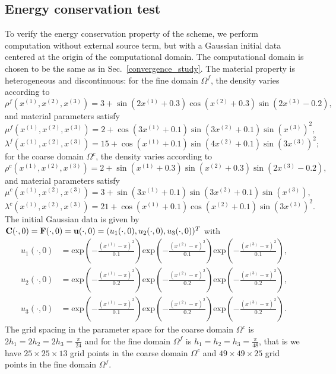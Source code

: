\subsection{Energy conservation test}\label{conserved_energy}
To verify the energy conservation property of the scheme, we perform computation without external source term, but with a Gaussian initial data centered at the origin of the computational domain. The computational domain is chosen to be the same as in Sec.~\ref{convergence_study}. The material property is heterogeneous and discontinuous: for the fine domain $\Omega^f$, the density varies according to
\[\rho^f(x^{(1)},x^{(2)},x^{(3)}) = 3 + \sin(2x^{(1)}+0.3)\cos(x^{(2)}+0.3)\sin(2x^{(3)}-0.2),\] 
and material parameters satisfy
\[\mu^f(x^{(1)},x^{(2)},x^{(3)}) = 2 + \cos(3x^{(1)}+0.1)\sin(3x^{(2)}+0.1)\sin(x^{(3)})^2,\]
\[\lambda^f(x^{(1)},x^{(2)},x^{(3)}) = 15 + \cos(x^{(1)}+0.1)\sin(4x^{(2)}+0.1)\sin(3x^{(3)})^2;\]
for the coarse domain $\Omega^c$, the density varies according to
\[\rho^c(x^{(1)},x^{(2)},x^{(3)}) = 2 + \sin(x^{(1)}+0.3)\sin(x^{(2)}+0.3)\sin(2x^{(3)}-0.2),\] 
and material parameters satisfy
\[\mu^c(x^{(1)},x^{(2)},x^{(3)}) = 3 + \sin(3x^{(1)}+0.1)\sin(3x^{(2)}+0.1)\sin(x^{(3)}),\]
\[\lambda^c(x^{(1)},x^{(2)},x^{(3)}) = 21 + \cos(x^{(1)}+0.1)\cos(x^{(2)}+0.1)\sin(3x^{(3)})^2.\]
The initial Gaussian data is given by ${\bf C}(\cdot,0) = {\bf F}(\cdot,0) = {\bf u}(\cdot,0) = (u_1(\cdot,0),u_2(\cdot,0),u_3(\cdot,0))^T$ with
\begin{align*}
	u_1(\cdot,0) &= \mbox{exp}\left(-\frac{(x^{(1)}-\pi)^2}{0.1}\right)\mbox{exp}\left(-\frac{(x^{(2)}-\pi)^2}{0.1}\right)\mbox{exp}\left(-\frac{(x^{(3)}-\pi)^2}{0.1}\right),\\
	u_2(\cdot,0) &= \mbox{exp}\left(-\frac{(x^{(1)}-\pi)^2}{0.2}\right)\mbox{exp}\left(-\frac{(x^{(2)}-\pi)^2}{0.2}\right)\mbox{exp}\left(-\frac{(x^{(3)}-\pi)^2}{0.2}\right),\\
	u_3(\cdot,0) &= \mbox{exp}\left(-\frac{(x^{(1)}-\pi)^2}{0.1}\right)\mbox{exp}\left(-\frac{(x^{(2)}-\pi)^2}{0.2}\right)\mbox{exp}\left(-\frac{(x^{(3)}-\pi)^2}{0.2}\right).
\end{align*}
 The grid spacing in the parameter space for the coarse domain $\Omega^c$ is $2h_1 = 2h_2 = 2h_3 = \frac{\pi}{24}$ and for the fine domain $\Omega^f$ is $h_1 = h_2 = h_3 = \frac{\pi}{48}$, that is we have $25\times25\times13$ grid points in the coarse domain $\Omega^c$ and $49\times49\times25$ grid points in the fine domain $\Omega^f$. 

